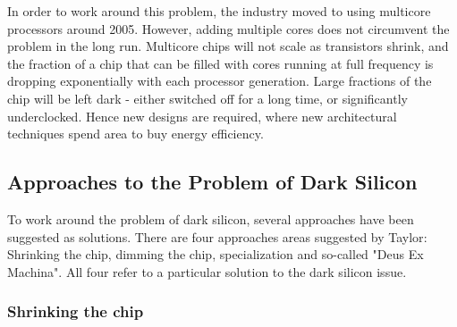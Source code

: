 In order to work around this problem, the industry moved to using multicore processors around 2005.
However, adding multiple cores does not circumvent the problem in the long run.
Multicore chips will not scale as transistors shrink, and the fraction of a chip that can be filled with cores running at full frequency is dropping exponentially with each processor generation. 
Large fractions of the chip will be left dark - either switched off for a long time, or significantly underclocked.
Hence new designs are required, where new architectural techniques spend area to buy energy efficiency. \cite{dark-silicon}

\subsection{Approaches to the Problem of Dark Silicon}
To work around the problem of dark silicon, several approaches have been suggested as solutions.
There are four approaches areas suggested by Taylor\cite{dark-silicon}: Shrinking the chip, dimming the chip, specialization and so-called "Deus Ex Machina".
All four refer to a particular solution to the dark silicon issue.



\subsubsection{Shrinking the chip}

